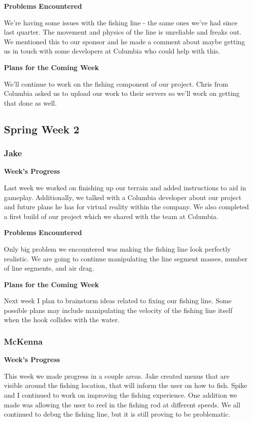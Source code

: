 \documentclass[10pt,journal,compsoc,onecolumn, draftclsnofoot]{IEEEtran}
\begin{document}
\noindent \textbf{Problems Encountered}

We're having some issues with the fishing line - the same ones we've had since last quarter. The movement and physics of the line is unreliable and freaks out. We mentioned this to our sponsor and he made a comment about maybe getting us in touch with some developers at Columbia who could help with this.

\noindent \textbf{Plans for the Coming Week}

We'll continue to work on the fishing component of our project. Chris from Columbia asked us to upload our work to their servers so we'll work on getting that done as well.

\subsection{Spring Week 2}
\subsubsection{Jake}
\noindent \textbf{Week's Progress}

Last week we worked on finishing up our terrain and added instructions to aid in gameplay. Additionally, we talked with a Columbia developer about our project and future plans he has for virtual reality within the company. We also completed a first build of our project which we shared with the team at Columbia.

\noindent \textbf{Problems Encountered}

Only big problem we encountered was making the fishing line look perfectly realistic. We are going to continue manipulating the line segment masses, number of line segments, and air drag.

\noindent \textbf{Plans for the Coming Week}

Next week I plan to brainstorm ideas related to fixing our fishing line. Some possible plans may include manipulating the velocity of the fishing line itself when the hook collides with the water.

\subsubsection{McKenna}
\noindent \textbf{Week's Progress}

This week we made progress in a couple areas. Jake created menus that are visible around the fishing location, that will inform the user on how to fish. Spike and I continued to work on improving the fishing experience. One addition we made was allowing the user to reel in the fishing rod at different speeds. We all continued to debug the fishing line, but it is still proving to be problematic.
\end{document}

